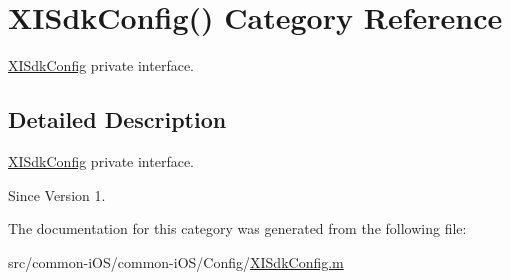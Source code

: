 \hypertarget{category_x_i_sdk_config_07_08}{}\section{X\+I\+Sdk\+Config() Category Reference}
\label{category_x_i_sdk_config_07_08}


\hyperlink{class_x_i_sdk_config}{X\+I\+Sdk\+Config} private interface.  




\subsection{Detailed Description}
\hyperlink{class_x_i_sdk_config}{X\+I\+Sdk\+Config} private interface. 

\begin{DoxySince}{Since}
Version 1. 
\end{DoxySince}


The documentation for this category was generated from the following file\+:\begin{DoxyCompactItemize}
\item 
src/common-\/i\+O\+S/common-\/i\+O\+S/\+Config/\hyperlink{_x_i_sdk_config_8m}{X\+I\+Sdk\+Config.\+m}\end{DoxyCompactItemize}
